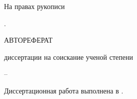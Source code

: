 
%
%
%
%

\thispagestyle{empty}

\begin{center}
	\disscouncil
	\par
\end{center}

\vspace{10mm}
\begin{flushright}
На правах рукописи

\end{flushright}

\vspace{10mm}
\begin{center}
{\bf \large \dissauthor}
\end{center}

\vspace{2mm}
\begin{center}
{\bf \large \disstitle
\par}

\vspace{10mm}
{%
\specnum. \specname
}

\vspace{10mm}
\MakeUppercase{Автореферат}

диссертации на соискание ученой степени

\edudegree
\end{center}


\vfill
\begin{center}
{\disscouncilcity -- \dissyear}
\end{center}



\newpage
\thispagestyle{empty}
\noindent Диссертационная работа выполнена в \dissorgsyn.

